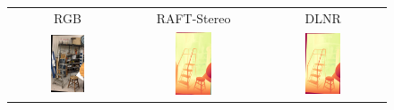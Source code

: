 \clearpage

\begin{figure}[h]
    \centering
    \renewcommand{\tabcolsep}{1pt}
    \begin{tabular}{ccc}
        \small RGB &
        \small RAFT-Stereo \cite{lipson2021raft} &
        \small DLNR \cite{zhao2023high} \\
        \includegraphics[width=0.3\textwidth]{imgs/midd21/rgb/11.jpg} & 
        \includegraphics[width=0.3\textwidth]{imgs/midd21/stereo/RAFT-Stereo/11.jpg} &
        \includegraphics[width=0.3\textwidth]{imgs/midd21/stereo/DLNR/11.jpg} \\

\end{tabular}
\end{figure}
